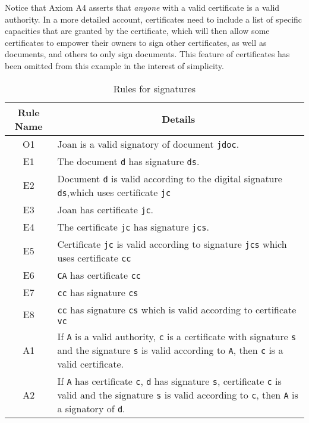 Notice that Axiom A4 asserts that {\em anyone} with a valid certificate is a valid authority. 
In a more detailed account, certificates need to include a list of specific capacities that are
granted by the certificate, which will then allow some certificates to empower their owners to
sign other certificates, as well as documents, and others to only sign documents. This feature of
certificates has been omitted from this example in the interest of simplicity.

\begin{table}[tb]
		\caption{Rules for signatures}\label{Authorship}
	\begin{center}
			\begin{tabular}{|c|p{6cm}|}
			\hline
			\bf Rule Name&\multicolumn{1}{|c|}{\bf Details} \\
			\hline
O1& Joan is a valid signatory of document {\tt jdoc}.\\
E1& The document {\tt d} has signature {\tt ds}.\\
E2 & Document {\tt d} is valid according to the digital signature {\tt ds},which uses certificate {\tt jc}\\
E3& Joan has certificate {\tt jc}.\\
E4& The certificate {\tt jc} has signature {\tt jcs}.\\
E5& Certificate {\tt jc} is valid according to signature {\tt jcs} which uses certificate {\tt cc} \\ %
					E6& {\tt CA} has certificate {\tt cc} \\ %
					E7& {\tt cc} has signature {\tt cs} \\ %
					E8& {\tt cc} has signature {\tt cs} which is valid according to certificate {\tt vc}\\ %
					A1& If {\tt A} is a valid authority, {\tt c} is a certificate with signature {\tt s} and the signature {\tt s} is
					valid according to {\tt A}, then {\tt c} is a valid certificate.\\
					A2& If {\tt A} has certificate {\tt c}, {\tt d} has signature {\tt s}, certificate {\tt c} is valid and the signature {\tt s} is
					valid according to {\tt c}, then {\tt A} is a signatory of {\tt d}.\\

\end{tabular}
\end{center}
\end{table}
